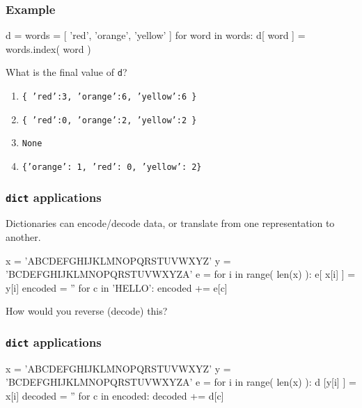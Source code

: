 \documentclass[11pt]{beamer}
\begin{document}
\begin{frame}[fragile]
  \frametitle{Example}
  \Enlarge

  \begin{semiverbatim}
d = {}
words = [ 'red', 'orange', 'yellow' ]
for word in words:
    d[ word ] = words.index( word )
  \end{semiverbatim}
  What is the final value of \texttt{d}?
  \begin{enumerate}[label=\Alph*]
  \item  \texttt{\{ 'red':3, 'orange':6, 'yellow':6 \}}
  \item  \texttt{\{ 'red':0, 'orange':2, 'yellow':2 \}}
  \item  \texttt{None}
  \item  \texttt{\{'orange': 1, 'red': 0, 'yellow': 2\}}
  \end{enumerate}
\end{frame}

\begin{frame}[fragile]
  \frametitle{\texttt{dict} applications}
  \Enlarge

  \begin{itemize}
  \myitem  Dictionaries can encode/decode data, or translate from one representation to another.
  \end{itemize}
  \begin{semiverbatim}
x = 'ABCDEFGHIJKLMNOPQRSTUVWXYZ'
y = 'BCDEFGHIJKLMNOPQRSTUVWXYZA'
e = {}
for i in range( len(x) ):
    e[ x[i] ] = y[i]
encoded = ''
for c in 'HELLO':
    encoded += e[c]
  \end{semiverbatim}
  \begin{itemize}
  \myitem  How would you reverse (decode) this?
  \end{itemize}
\end{frame}

\begin{frame}[fragile]
  \frametitle{\texttt{dict} applications}
  \Enlarge

  \begin{semiverbatim}
x = 'ABCDEFGHIJKLMNOPQRSTUVWXYZ'
y = 'BCDEFGHIJKLMNOPQRSTUVWXYZA'
e = {}
for i in range( len(x) ):
    d [y[i] ] = x[i]
decoded = ''
for c in encoded:
    decoded += d[c]
  \end{semiverbatim}
\end{frame}
\end{document}
